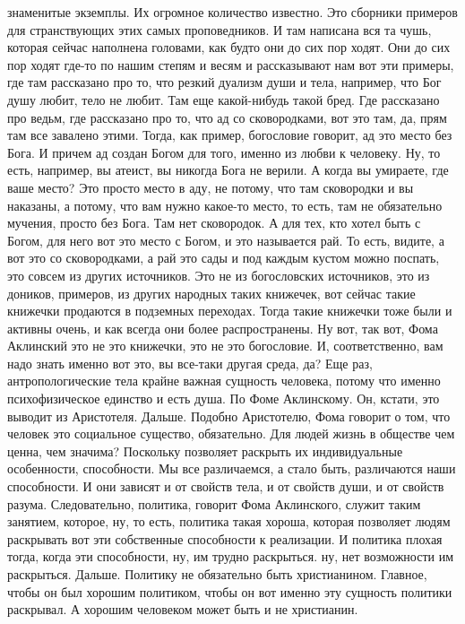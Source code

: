 знаменитые экземплы. Их огромное количество известно. Это сборники примеров для
странствующих этих самых проповедников. И там написана вся та чушь, которая
сейчас наполнена головами, как будто они до сих пор ходят. Они до сих пор ходят
где-то по нашим степям и весям и рассказывают нам вот эти примеры, где там
рассказано про то, что резкий дуализм души и тела, например, что Бог душу любит,
тело не любит. Там еще какой-нибудь такой бред. Где рассказано про ведьм, где
рассказано про то, что ад со сковородками, вот это там, да, прям там все
завалено этими. Тогда, как пример, богословие говорит, ад это место без Бога. И
причем ад создан Богом для того, именно из любви к человеку. Ну, то есть,
например, вы атеист, вы никогда Бога не верили. А когда вы умираете, где ваше
место? Это просто место в аду, не потому, что там сковородки и вы наказаны, а
потому, что вам нужно какое-то место, то есть, там не обязательно мучения,
просто без Бога. Там нет сковородок. А для тех, кто хотел быть с Богом, для него
вот это место с Богом, и это называется рай. То есть, видите, а вот это со
сковородками, а рай это сады и под каждым кустом можно поспать, это совсем из
других источников. Это не из богословских источников, это из доников, примеров,
из других народных таких книжечек, вот сейчас такие книжечки продаются в
подземных переходах. Тогда такие книжечки тоже были и активны очень, и как
всегда они более распространены. Ну вот, так вот, Фома Аклинский это не это
книжечки, это не это богословие. И, соответственно, вам надо знать именно вот
это, вы все-таки другая среда, да? Еще раз, антропологические тела крайне важная
сущность человека, потому что именно психофизическое единство и есть душа. По
Фоме Аклинскому. Он, кстати, это выводит из Аристотеля. Дальше. Подобно
Аристотелю, Фома говорит о том, что человек это социальное существо,
обязательно. Для людей жизнь в обществе чем ценна, чем значима? Поскольку
позволяет раскрыть их индивидуальные особенности, способности. Мы все
различаемся, а стало быть, различаются наши способности. И они зависят и от
свойств тела, и от свойств души, и от свойств разума. Следовательно, политика,
говорит Фома Аклинского, служит таким занятием, которое, ну, то есть, политика
такая хороша, которая позволяет людям раскрывать вот эти собственные способности
к реализации. И политика плохая тогда, когда эти способности, ну, им трудно
раскрыться. ну, нет возможности им раскрыться. Дальше. Политику не обязательно
быть христианином. Главное, чтобы он был хорошим политиком, чтобы он вот именно
эту сущность политики раскрывал. А хорошим человеком может быть и не христианин.
